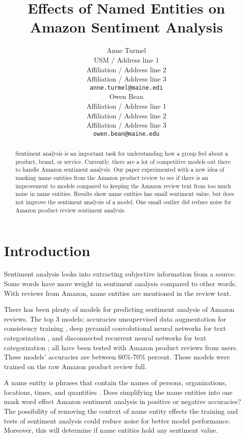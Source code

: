 \documentclass[11pt,a4paper]{article}
\title{Effects of Named Entities on Amazon Sentiment Analysis}
\author{Anne Turmel \\
  USM / Address line 1 \\
  Affiliation / Address line 2 \\
  Affiliation / Address line 3 \\
  \texttt{anne.turmel@maine.edi} \\\And
  Owen Bean \\
  Affiliation / Address line 1 \\
  Affiliation / Address line 2 \\
  Affiliation / Address line 3 \\
  \texttt{owen.bean@maine.edu} \\}
\date{}
\begin{document}
\maketitle
\begin{abstract}
Sentiment analysis is an important task for understanding how a group feel about a product, brand, or service. Currently, there are a lot of competitive models out there to handle Amazon sentiment analysis. Our paper experimented with a new idea of masking name entities from the Amazon product review to see if there is an improvement to models compared to keeping the Amazon review text from too much noise in name entities. Results show name entities has small sentiment value, but does not improve the sentiment analysis of a model. One small outlier did reduce noise for Amazon product review sentiment analysis.

\end{abstract}

\section{Introduction}

Sentiment analysis looks into extracting subjective information from a source. Some words have more weight in sentiment analysis compared to other words. With reviews from Amazon, name entities are mentioned in the review text.

There has been plenty of models for predicting sentiment analysis of Amazon reviews. The top 3 models; accuracies unsupervised data augmentation for consistency training \cite{unsupervised}, deep pyramid convolutional neural networks for text categorization \cite{pyramid}, and disconnected recurrent neural networks for text categorization \cite{disconnect}; all have been tested with Amazon product reviews from users. These models' accuracies are between 60\%-70\% percent. These models were trained on the raw Amazon product review full.

A name entity is phrases that contain the names of persons, organizations, locations, times, and quantities \cite{conll}. Does simplifying the name entities into one mask word effect Amazon sentiment analysis in positive or negative accuracies? The possibility of removing the context of name entity effects the training and tests of sentiment analysis could reduce noise for better model performance. Moreover, this will determine if name entities hold any sentiment value.
\end{document}

